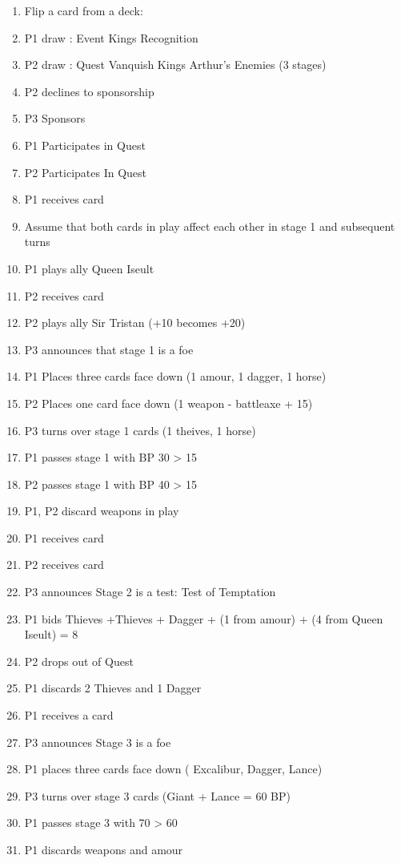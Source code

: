 \documentclass[a4paper,11pt]{article}
\begin{document}
\begin{enumerate}
\item Flip a card from a deck: 
\item P1 draw : Event Kings Recognition 
\item P2 draw : Quest Vanquish Kings Arthur's Enemies (3 stages)
\item P2 declines to sponsorship
\item P3 Sponsors 
\item P1 Participates in Quest
\item P2 Participates In Quest
\item P1 receives card
\item Assume that both cards in play affect each other in stage 1 and subsequent turns
\item P1 plays ally Queen Iseult 
\item P2 receives card
\item P2 plays ally Sir Tristan (+10 becomes +20)
\item P3 announces that stage 1 is a foe
\item P1 Places three cards face down (1 amour, 1 dagger, 1 horse) 
\item P2 Places one card face down (1 weapon - battleaxe + 15)
\item P3 turns over stage 1 cards (1 theives, 1 horse)
\item P1 passes stage 1 with BP 30 > 15
\item P2 passes stage 1 with BP 40 > 15
\item P1, P2 discard weapons in play
\item P1 receives card
\item P2 receives card
\item P3 announces Stage 2 is a test: Test of Temptation
\item P1 bids Thieves +Thieves + Dagger + (1 from amour) + (4 from Queen Iseult) = 8
\item P2 drops out of Quest
\item P1 discards 2 Thieves and 1 Dagger
\item P1 receives a card
\item P3 announces Stage 3 is a foe
\item P1 places three cards face down ( Excalibur, Dagger, Lance)
\item P3 turns over stage 3 cards (Giant + Lance = 60 BP)
\item P1 passes stage 3 with 70 > 60
\item P1 discards weapons and amour

\end{enumerate}
\end{document}
